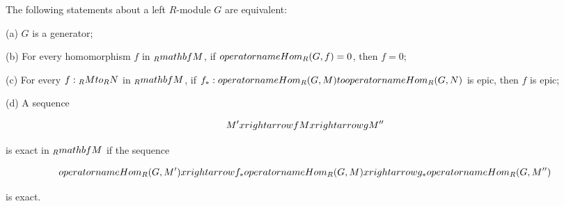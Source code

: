 The following statements about a left $R$-module $G$ are equivalent:

(a) $G$ is a generator;

(b) For every homomorphism $f$ in ${}_R\\mathbf{M}$, if $\\operatorname{Hom}_R(G, f) = 0$, then $f = 0$;

(c) For every $f: {}_R M \\to {}_R N$ in ${}_R\\mathbf{M}$, if $f_*: \\operatorname{Hom}_R(G, M) \\to \\operatorname{Hom}_R(G, N)$ is epic, then $f$ is epic;

(d) A sequence

$$M' \\xrightarrow{f} M \\xrightarrow{g} M''$$

is exact in ${}_R\\mathbf{M}$ if the sequence

$$\\operatorname{Hom}_R(G, M') \\xrightarrow{f_*} \\operatorname{Hom}_R(G, M) \\xrightarrow{g_*} \\operatorname{Hom}_R(G, M'')$$

is exact.
